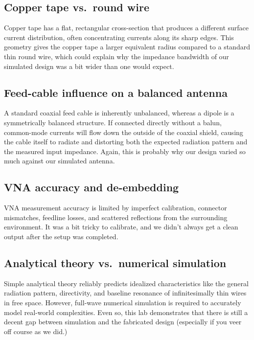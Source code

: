 \documentclass[11pt]{article}
\begin{document}
\subsection*{Copper tape vs.\ round wire}
Copper tape has a flat, rectangular cross-section that produces a different surface current distribution, often concentrating currents along its sharp edges. This geometry gives the copper tape a larger equivalent radius compared to a standard thin round wire, which could explain why the impedance bandwidth of our simulated design was a bit wider than one would expect.

\subsection*{Feed-cable influence on a balanced antenna}
A standard coaxial feed cable is inherently unbalanced, whereas a dipole is a symmetrically balanced structure. If connected directly without a balun, common-mode currents will flow down the outside of the coaxial shield, causing the cable itself to radiate and distorting both the expected radiation pattern and the measured input impedance. Again, this is probably why our design varied so much against our simulated antenna.

\subsection*{VNA accuracy and de-embedding}
VNA measurement accuracy is limited by imperfect calibration, connector mismatches, feedline losses, and scattered reflections from the surrounding environment. It was a bit tricky to calibrate, and we didn't always get a clean output after the setup was completed.

\subsection*{Analytical theory vs.\ numerical simulation}
Simple analytical theory reliably predicts idealized characteristics like the general radiation pattern, directivity, and baseline resonance of infinitesimally thin wires in free space. However, full-wave numerical simulation is required to accurately model real-world complexities. Even so, this lab demonstrates that there is still a decent gap between simulation and the fabricated design (especially if you veer off course as we did.)

\end{document}
